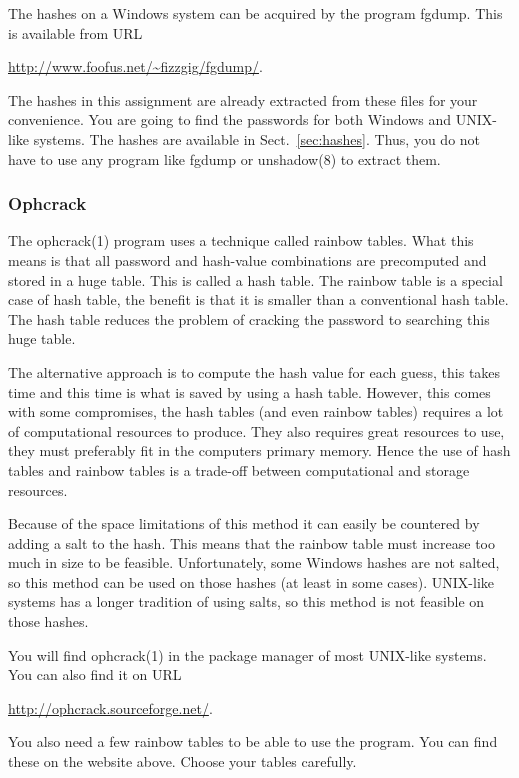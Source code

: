 The hashes on a Windows system can be acquired by the program fgdump.
This is available from URL
\begin{center}
  \url{http://www.foofus.net/~fizzgig/fgdump/}.
\end{center}

The hashes in this assignment are already extracted from these files for your 
convenience.
You are going to find the passwords for both Windows and UNIX-like systems.
The hashes are available in Sect.~\ref{sec:hashes}.
Thus, you do not have to use any program like fgdump or unshadow(8) to extract 
them.

\subsubsection{Ophcrack}

The ophcrack(1) program uses a technique called rainbow tables.
What this means is that all password and hash-value combinations are 
precomputed and stored in a huge table.
This is called a hash table.
The rainbow table is a special case of hash table, the benefit is that it is 
smaller than a conventional hash table.
The hash table reduces the problem of cracking the password to searching this 
huge table.

The alternative approach is to compute the hash value for each guess, this 
takes time and this time is what is saved by using a hash table.
However, this comes with some compromises, the hash tables (and even rainbow 
tables) requires a lot of computational resources to produce.
They also requires great resources to use, they must preferably fit in the 
computers primary memory.
Hence the use of hash tables and rainbow tables is a trade-off between 
computational and storage resources.

Because of the space limitations of this method it can easily be countered by 
adding a salt to the hash.
This means that the rainbow table must increase too much in size to be 
feasible.
Unfortunately, some Windows hashes are not salted, so this method can be used 
on those hashes (at least in some cases).
UNIX-like systems has a longer tradition of using salts, so this method is not 
feasible on those hashes.

You will find ophcrack(1) in the package manager of most UNIX-like systems.
You can also find it on URL
\begin{center}
  \url{http://ophcrack.sourceforge.net/}.
\end{center}
You also need a few rainbow tables to be able to use the program.
You can find these on the website above.
Choose your tables carefully.


